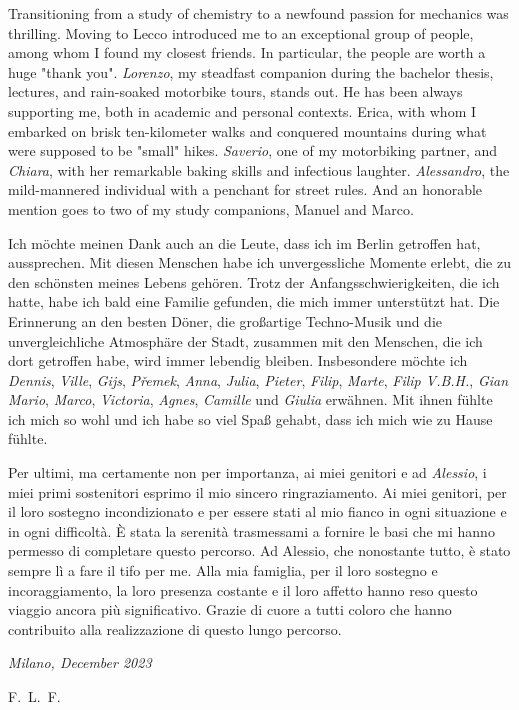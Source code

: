 \documentclass{Configuration_Files/PoliMi3i_thesis}
\begin{document}
Transitioning from a study of chemistry to a newfound passion for mechanics was thrilling. Moving to Lecco introduced me to an exceptional group of people, among whom I found my closest friends. In particular, the people are worth a huge "thank you". \textit{Lorenzo}, my steadfast companion during the bachelor thesis, lectures, and rain-soaked motorbike tours, stands out. He has been always supporting me, both in academic and personal contexts. Erica, with whom I embarked on brisk ten-kilometer walks and conquered mountains during what were supposed to be "small" hikes. \textit{Saverio}, one of my motorbiking partner, and \textit{Chiara}, with her remarkable baking skills and infectious laughter. \textit{Alessandro}, the mild-mannered individual with a penchant for street rules. And an honorable mention goes to two of my study companions, Manuel and Marco.

Ich möchte meinen Dank auch an die Leute, dass ich im Berlin getroffen hat, aussprechen. Mit diesen Menschen habe ich unvergessliche Momente erlebt, die zu den schönsten meines Lebens gehören. Trotz der Anfangsschwierigkeiten, die ich hatte, habe ich bald eine Familie gefunden, die mich immer unterstützt hat. Die Erinnerung an den besten Döner, die großartige Techno-Musik und die unvergleichliche Atmosphäre der Stadt, zusammen mit den Menschen, die ich dort getroffen habe, wird immer lebendig bleiben. Insbesondere möchte ich \textit{Dennis}, \textit{Ville}, \textit{Gijs}, \textit{P\v{r}emek}, \textit{Anna}, \textit{Julia}, \textit{Pieter}, \textit{Filip}, \textit{Marte}, \textit{Filip V.B.H.}, \textit{Gian Mario}, \textit{Marco}, \textit{Victoria}, \textit{Agnes}, \textit{Camille} und \textit{Giulia} erwähnen. Mit ihnen fühlte ich mich so wohl und ich habe so viel Spaß gehabt, dass ich mich wie zu Hause fühlte.

Per ultimi, ma certamente non per importanza, ai miei genitori e ad \textit{Alessio}, i miei primi sostenitori esprimo il mio sincero ringraziamento. Ai miei genitori, per il loro sostegno incondizionato e per essere stati al mio fianco in ogni situazione e in ogni difficoltà. È stata la serenità trasmessami a fornire le basi che mi hanno permesso di completare questo percorso. Ad Alessio, che nonostante tutto, è stato sempre lì a fare il tifo per me. Alla mia famiglia, per il loro sostegno e incoraggiamento, la loro presenza costante e il loro affetto hanno reso questo viaggio ancora più significativo. Grazie di cuore a tutti coloro che hanno contribuito alla realizzazione di questo lungo percorso.

\noindent\textit{Milano, December 2023}

\begin{flushright}
    \hfill F.~L.~F.
\end{flushright}

\cleardoublepage
\end{document}

